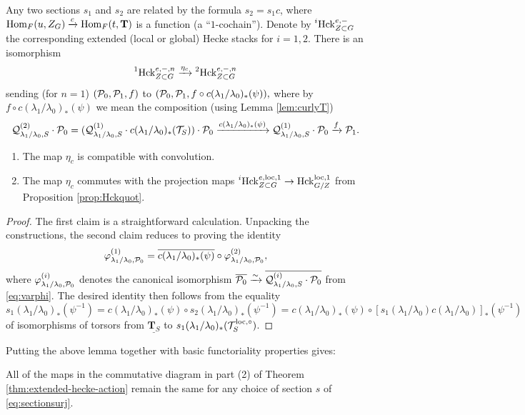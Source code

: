 Any two sections $s_{1}$ and $s_{2}$ are related by the formula $s_{2} = s_{1}c$, where $\mathrm{Hom}_{F}(u,Z_{G}) \xrightarrow{c} \mathrm{Hom}_{F}(t,\mathbf{T})$ is a function (a ``$1$-cochain''). Denote by $\prescript{i}{}\Hck^{e,-}_{Z \subset G}$ the corresponding extended (local or global) Hecke stacks for $i=1,2$. There is an isomorphism
\begin{equation*}
    \prescript{1}{}\Hck^{e,-,n}_{Z \subset G} \xrightarrow{\eta_{c}} \prescript{2}{}\Hck^{e,-,n}_{Z \subset G}
\end{equation*}
sending (for $n=1$) $(\mathcal{P}_{0}, \mathcal{P}_{1}, f)$ to $(\mathcal{P}_{0}, \mathcal{P}_{1}, f \circ c(\lambda_{1}/\lambda_{0})_{*}(\psi)),$ where by $f \circ c(\lambda_{1}/\lambda_{0})_{*}(\psi)$ we mean the composition (using Lemma \ref{lem:curlyT})
\begin{equation*}
    \mathcal{Q}^{(2)}_{\lambda_{1}/\lambda_{0},S} \cdot \mathcal{P}_{0} = (\mathcal{Q}^{(1)}_{\lambda_{1}/\lambda_{0},S} \cdot c(\lambda_{1}/\lambda_{0})_{*}(\mathcal{T}_{S})) \cdot \mathcal{P}_{0} \xrightarrow{c(\lambda_{1}/\lambda_{0})_{*}(\psi)}\mathcal{Q}^{(1)}_{\lambda_{1}/\lambda_{0},S}  \cdot \mathcal{P}_{0} \xrightarrow{f} \mathcal{P}_{1}.
\end{equation*}

\begin{lem}
\begin{enumerate}
    \item{The map $\eta_{c}$ is compatible with convolution.}
    \item{The map $\eta_{c}$ commutes with the projection maps $\prescript{i}{}\Hck^{e,\loc,1}_{Z \subset G} \to \Hck_{G/Z}^{\loc,1}$ from Proposition \ref{prop:Hckquot}.}
    \end{enumerate}
\end{lem}

\begin{proof}
    The first claim is a straightforward calculation. Unpacking the constructions, the second claim reduces to proving the identity
    \begin{equation*}
        \varphi^{(1)}_{\lambda_{1}/\lambda_{0},\mathcal{P}_{0}} = \overline{c(\lambda_{1}/\lambda_{0})_{*}(\psi)} \circ \varphi^{(2)}_{\lambda_{1}/\lambda_{0},\mathcal{P}_{0}},
    \end{equation*}
    where $\varphi^{(i)}_{\lambda_{1}/\lambda_{0},\mathcal{P}_{0}}$ denotes the canonical isomorphism $\overline{\mathcal{P}_{0}} \xrightarrow{\sim} \overline{\mathcal{Q}_{\lambda_{1}/\lambda_{0},S}^{(i)} \cdot \mathcal{P}_{0}}$ from \eqref{eq:varphi}. The desired identity then follows from the equality
    \begin{equation*}
        s_{1}(\lambda_{1}/\lambda_{0})_{*}(\psi^{-1}) = c(\lambda_{1}/\lambda_{0})_{*}(\psi) \circ s_{2}(\lambda_{1}/\lambda_{0})_{*}(\psi^{-1}) = c(\lambda_{1}/\lambda_{0})_{*}(\psi) \circ [s_{1}(\lambda_{1}/\lambda_{0})c(\lambda_{1}/\lambda_{0})]_{*}(\psi^{-1} )
    \end{equation*}
    of isomorphisms of torsors from $\underline{\mathbf{T}_{S}}$ to $s_{1}(\lambda_{1}/\lambda_{0})_{*}(\mathcal{T}_{S}^{\mathrm{loc},\circ})$. 
\end{proof}

Putting the above lemma together with basic functoriality properties gives:

\begin{prop}
  All of the maps in the commutative diagram in part (2) of Theorem \ref{thm:extended-hecke-action} remain the same for any choice of section $s$ of \eqref{eq:sectionsurj}.
\end{prop}
 